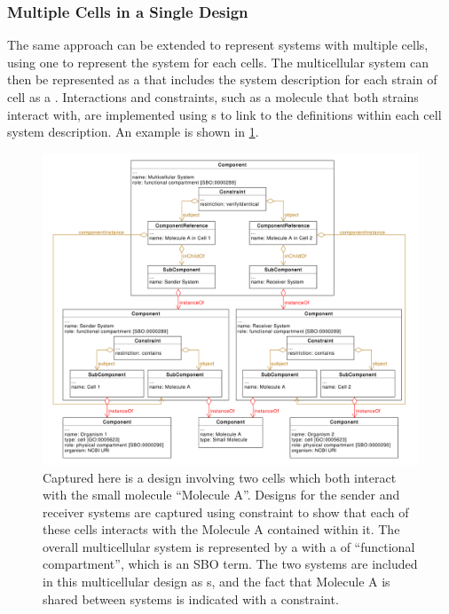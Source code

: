 \subsubsection{Multiple Cells in a Single Design}

The same approach can be extended to represent systems with multiple cells, using one  to represent the system for each cells.
The multicellular system can then be represented as a  that includes the system description for each strain of cell as a .
Interactions and constraints, such as a molecule that both strains interact with, are implemented using s to link to the definitions within each cell system description.
An example is shown in \ref{uml:multiple_cell_representation}.

\begin{figure}[ht]
	\begin{center}
		\includegraphics[width=\textwidth]{uml/two_cell_representation}
		\caption[]{Captured here is a design involving two cells which both interact with the small molecule ``Molecule A''. 
		Designs for the sender and receiver systems are captured using constraint to show that each of these cells interacts with the Molecule A contained within it.
		The overall multicellular system is represented by a  with a  of ``functional compartment'', which is an SBO term.
		The two systems are included in this multicellular design as s, and the fact that Molecule A is shared between systems is indicated with a constraint.}
		\label{uml:multiple_cell_representation}
	\end{center}
\end{figure}

